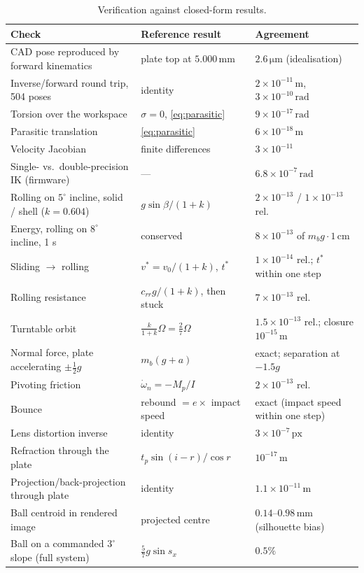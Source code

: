 \documentclass[10pt,a4paper]{article}
\newcommand{\un}[1]{\,\mathrm{#1}}
\begin{document}
\begin{table}[h]
\centering
\caption{Verification against closed-form results.}
\label{tab:verification}
\small
\begin{tabularx}{\textwidth}{Xll}
\toprule
Check & Reference result & Agreement\\
\midrule
CAD pose reproduced by forward kinematics & plate top at $5.000\un{mm}$ & $2.6\un{\mu m}$ (idealisation)\\
Inverse/forward round trip, 504 poses & identity & $2\times10^{-11}\un{m}$, $3\times10^{-10}\un{rad}$\\
Torsion over the workspace & $\sigma=0$, \eqref{eq:parasitic} & $9\times10^{-17}\un{rad}$\\
Parasitic translation & \eqref{eq:parasitic} & $6\times10^{-18}\un{m}$\\
Velocity Jacobian & finite differences & $3\times10^{-11}$\\
Single- vs.\ double-precision IK (firmware) & --- & $6.8\times10^{-7}\un{rad}$\\
Rolling on $5^\circ$ incline, solid / shell ($k=0.604$) & $g\sin\beta/(1+k)$ & $2\times10^{-13}$ / $1\times10^{-13}$ rel.\\
Energy, rolling on $8^\circ$ incline, 1 s & conserved & $8\times10^{-13}$ of $m_bg\cdot1\un{cm}$\\
Sliding $\to$ rolling & $v^*=v_0/(1+k)$, $t^*$ & $1\times10^{-14}$ rel.; $t^*$ within one step\\
Rolling resistance & $c_{rr}g/(1+k)$, then stuck & $7\times10^{-13}$ rel.\\
Turntable orbit & $\frac{k}{1+k}\Omega=\frac27\Omega$ & $1.5\times10^{-13}$ rel.; closure $10^{-15}\un{m}$\\
Normal force, plate accelerating $\pm\frac12g$ & $m_b(g+a)$ & exact; separation at $-1.5g$\\
Pivoting friction & $\dot\omega_n=-M_p/I$ & $2\times10^{-13}$ rel.\\
Bounce & rebound $=e\times$ impact speed & exact (impact speed within one step)\\
Lens distortion inverse & identity & $3\times10^{-7}\un{px}$\\
Refraction through the plate & $t_p\sin(i-r)/\cos r$ & $10^{-17}\un{m}$\\
Projection/back-projection through plate & identity & $1.1\times10^{-11}\un{m}$\\
Ball centroid in rendered image & projected centre & $0.14$--$0.98\un{mm}$ (silhouette bias)\\
Ball on a commanded $3^\circ$ slope (full system) & $\frac{5}{7}g\sin s_x$ & $0.5\%$\\
\bottomrule
\end{tabularx}
\end{table}
\end{document}
